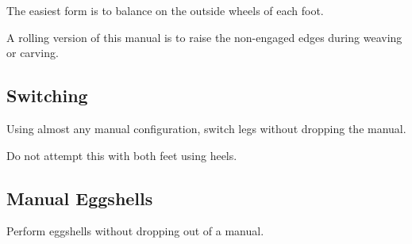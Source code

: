 The easiest form is to balance on the outside wheels of each foot.

A rolling version of this manual is to raise the non-engaged edges during weaving or carving.



\subsection*{Switching}
Using almost any manual configuration, switch legs without dropping the manual.

Do not attempt this with both feet using heels.


\subsection*{Manual Eggshells}

Perform eggshells without dropping out of a manual.
